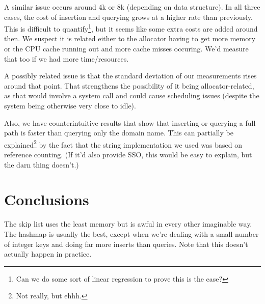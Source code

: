 \documentclass[12pt,a4paper]{article}
\begin{document}
    A similar issue occurs around 4k or 8k (depending on data structure).  In all three cases, the
    cost of insertion and querying grows at a higher rate than previously.  This is difficult to
    quantify\footnote{Can we do some sort of linear regression to prove this is the case?}, but it
    seems like some extra costs are added around then.  We suspect it is related either to the
    allocator having to get more memory or the CPU cache running out and more cache misses occuring.
    We'd measure that too if we had more time/resources.

    A possibly related issue is that the standard deviation of our measurements rises around that
    point.  That strengthens the possibility of it being allocator-related, as that would involve a
    system call and could cause scheduling issues (despite the system being otherwise very close to
    idle).

    Also, we have counterintuitive results that show that inserting or querying a full path is
    faster than querying only the domain name.  This can partially be explained\footnote{Not really,
    but ehhh.} by the fact that the string implementation we used was based on reference counting.
    (If it'd also provide SSO, this would be easy to explain, but the darn thing doesn't.)


    \section{Conclusions}

    The skip list uses the least memory but is awful in every other imaginable way.  The hashmap is
    usually the best, except when we're dealing with a small number of integer keys and doing far more
    inserts than queries.  Note that this doesn't actually happen in practice.

    

    
\end{document}
